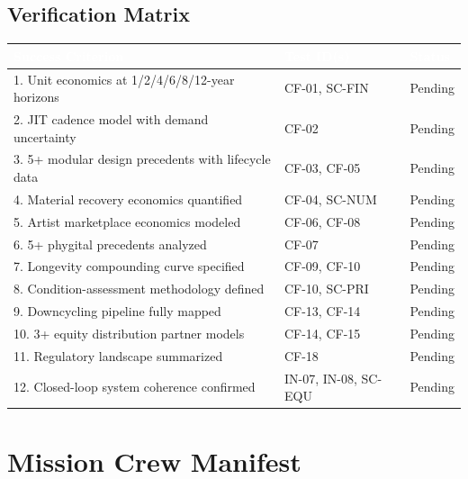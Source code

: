 \documentclass[11pt,letterpaper]{article}
\newcommand{\tableheader}[1]{\textbf{\sffamily\textcolor{white}{#1}}}
\begin{document}
\subsection{Verification Matrix}

\begin{center}
\begin{tabularx}{\textwidth}{XL{3.5cm}C{1.5cm}}
\toprule
{}
\tableheader{Success Criterion} & \tableheader{Test ID(s)} & \tableheader{Status} \\
. Unit economics at 1/2/4/6/8/12-year horizons & CF-01, SC-FIN & Pending \\
2. JIT cadence model with demand uncertainty & CF-02 & Pending \\
3. 5+ modular design precedents with lifecycle data & CF-03, CF-05 & Pending \\
4. Material recovery economics quantified & CF-04, SC-NUM & Pending \\
5. Artist marketplace economics modeled & CF-06, CF-08 & Pending \\
6. 5+ phygital precedents analyzed & CF-07 & Pending \\
7. Longevity compounding curve specified & CF-09, CF-10 & Pending \\
8. Condition-assessment methodology defined & CF-10, SC-PRI & Pending \\
9. Downcycling pipeline fully mapped & CF-13, CF-14 & Pending \\
10. 3+ equity distribution partner models & CF-14, CF-15 & Pending \\
11. Regulatory landscape summarized & CF-18 & Pending \\
12. Closed-loop system coherence confirmed & IN-07, IN-08, SC-EQU & Pending \\
\bottomrule
\end{tabularx}
\end{center}

\section{Mission Crew Manifest}
\end{document}
